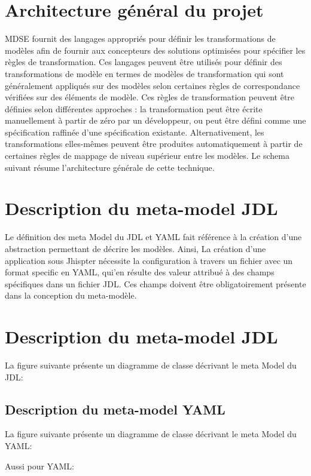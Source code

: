 \section{Architecture général du projet}

MDSE fournit des langages appropriés pour définir les transformations de
modèles afin de fournir aux concepteurs des solutions optimisées pour
spécifier les règles de transformation. Ces langages peuvent être
utilisés pour définir des transformations de modèle en termes de modèles
de transformation qui sont généralement appliqués sur des modèles selon
certaines règles de correspondance vérifiées sur des éléments de modèle.
Ces règles de transformation peuvent être définies selon différentes
approches : la transformation peut être écrite manuellement à partir de
zéro par un développeur, ou peut être défini comme une spécification
raffinée d'une spécification existante. Alternativement, les
transformations elles-mêmes peuvent être produites automatiquement à
partir de certaines règles de mappage de niveau supérieur entre les
modèles. Le schema suivant résume l'architecture générale de cette
technique.

\section{Description du meta-model JDL}

Le définition des meta Model du JDL et YAML fait référence à la création
d'une abstraction permettant de décrire les modèles. Ainsi, La création
d'une application sous Jhispter nécessite la configuration à 
travers un fichier avec un format specific en YAML, qui'en résulte
des valeur attribué à des champs spécifiques dans un fichier JDL. 
Ces champs doivent être obligatoirement présente dans la conception
du meta-modèle.

\section{Description du meta-model JDL}

La figure suivante présente un diagramme de classe décrivant 
le meta Model du JDL:


\subsection{Description du meta-model YAML}

La figure suivante présente un diagramme de classe décrivant 
le meta Model du YAML:

Aussi pour YAML:\\
\begin{figure}[H]
  \begin{center}
      \caption{}
  \end{center}
\end{figure}
